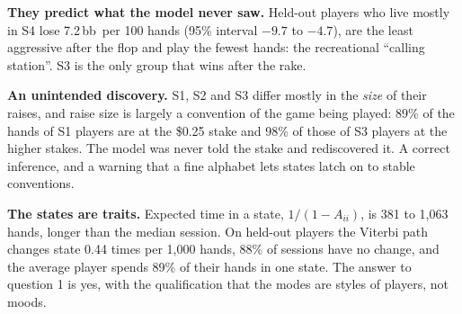 \documentclass{article}
\newcommand{\bb}{\,bb}
\begin{document}
\textbf{They predict what the model never saw.} Held-out players who live mostly in S4 lose 7.2\bb\ per 100 hands (95\% interval $-9.7$ to $-4.7$), are the least aggressive after the flop and play the fewest hands: the recreational ``calling station''. S3 is the only group that wins after the rake.

\textbf{An unintended discovery.} S1, S2 and S3 differ mostly in the \emph{size} of their raises, and raise size is largely a convention of the game being played: 89\% of the hands of S1 players are at the \$0.25 stake and 98\% of those of S3 players at the higher stakes. The model was never told the stake and rediscovered it. A correct inference, and a warning that a fine alphabet lets states latch on to stable conventions.

\textbf{The states are traits.} Expected time in a state, $1/(1-A_{ii})$, is 381 to 1{,}063 hands, longer than the median session. On held-out players the Viterbi path changes state 0.44 times per 1{,}000 hands, 88\% of sessions have no change, and the average player spends 89\% of their hands in one state. The answer to question 1 is yes, with the qualification that the modes are styles of players, not moods.

\end{document}
